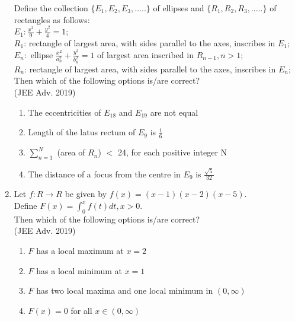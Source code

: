 \documentclass[journal,12pt,twocolumn]{IEEEtran}
\theoremstyle{remark}
\begin{document}
\begin{enumerate}
{            Define the collection $\{E_1, E_2, E_3, .....\}$ of ellipses and $\{R_1, R_2, R_3, .....\}$ of rectangles as follows:\\[6pt]
            $E_1 : \frac{x^2}{9}+ \frac{y^2}{4} = 1$;\\[6pt]
            $R_1$: rectangle of largest area, with sides parallel to the axes, inscribes in $E_1$;\\[6pt]
            $E_n : $ ellipse $\frac{x^2}{a_n^2}+ \frac{y^2}{b_n^2} = 1$ of largest area inscribed in $R_{n-1}, n>1;$\\[6pt]
            $R_n$: rectangle of largest area, with sides parallel to the axes, inscribes in $E_n$;\\ Then which of the following options is/are correct?
            \\ \text{   } \hfill
                {(JEE Adv. 2019)}
            
            \begin{enumerate}
                \item The eccentricities of $E_{18}$ and $E_{19}$ are not equal
                \item Length of the latus rectum of $E_{9}$ is $\frac{1}{6}$
                \item $\sum_{n=1}^N$ (area of $R_n$) $<$ 24, for each positive integer N
                \item The distance of a focus from the centre in $E_9$ is $\frac{\sqrt{5}}{32}$
            \end{enumerate}
        
        }
    \item{
        
            Let $f: R\rightarrow R$ be given by $f(x) = (x-1)(x-2)(x-5)$.\\[6pt] 
            Define $F(x) = \int_0^x f(t)dt, x>0$.\\[3pt]
            Then which of the following options is/are correct?
            \\ \text{   } \hfill
                {(JEE Adv. 2019)}
            
            \begin{enumerate}
                \item $F$ has a local maximum at $x=2$
                \item $F$ has a local minimum at $x=1$
                \item $F$ has two local maxima and one local minimum in $(0,\infty)$
                \item $F(x) = 0$ for all $x \in (0,\infty)$
            \end{enumerate}
        
}
\end{enumerate}
\end{document}
